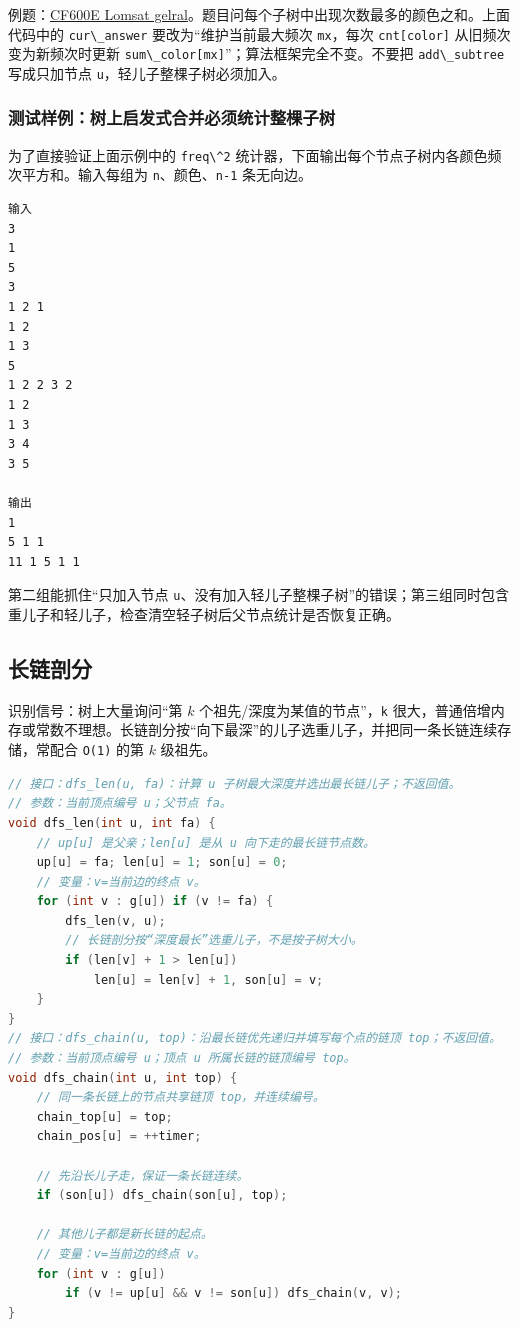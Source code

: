 例题：\href{https://codeforces.com/problemset/problem/600/E}{CF600E Lomsat gelral}。题目问每个子树中出现次数最多的颜色之和。上面代码中的 \passthrough{\lstinline!cur\_answer!} 要改为``维护当前最大频次 \passthrough{\lstinline!mx!}，每次 \passthrough{\lstinline!cnt[color]!} 从旧频次变为新频次时更新 \passthrough{\lstinline!sum\_color[mx]!}''；算法框架完全不变。不要把 \passthrough{\lstinline!add\_subtree!} 写成只加节点 \passthrough{\lstinline!u!}，轻儿子整棵子树必须加入。

\subsubsection{测试样例：树上启发式合并必须统计整棵子树}

为了直接验证上面示例中的 \passthrough{\lstinline!freq\^2!} 统计器，下面输出每个节点子树内各颜色频次平方和。输入每组为 \passthrough{\lstinline!n!}、颜色、\passthrough{\lstinline!n-1!} 条无向边。

\begin{lstlisting}
输入
3
1
5
3
1 2 1
1 2
1 3
5
1 2 2 3 2
1 2
1 3
3 4
3 5

输出
1
5 1 1
11 1 5 1 1
\end{lstlisting}

第二组能抓住``只加入节点 \passthrough{\lstinline!u!}、没有加入轻儿子整棵子树''的错误；第三组同时包含重儿子和轻儿子，检查清空轻子树后父节点统计是否恢复正确。


\subsection{长链剖分}

识别信号：树上大量询问``第 \(k\) 个祖先/深度为某值的节点''，\passthrough{\lstinline!k!} 很大，普通倍增内存或常数不理想。长链剖分按``向下最深''的儿子选重儿子，并把同一条长链连续存储，常配合 \passthrough{\lstinline!O(1)!} 的第 \(k\) 级祖先。

\begin{lstlisting}[language={C++}]
// 接口：dfs_len(u, fa)：计算 u 子树最大深度并选出最长链儿子；不返回值。
// 参数：当前顶点编号 u；父节点 fa。
void dfs_len(int u, int fa) {
    // up[u] 是父亲；len[u] 是从 u 向下走的最长链节点数。
    up[u] = fa; len[u] = 1; son[u] = 0;
    // 变量：v=当前边的终点 v。
    for (int v : g[u]) if (v != fa) {
        dfs_len(v, u);
        // 长链剖分按“深度最长”选重儿子，不是按子树大小。
        if (len[v] + 1 > len[u])
            len[u] = len[v] + 1, son[u] = v;
    }
}
// 接口：dfs_chain(u, top)：沿最长链优先递归并填写每个点的链顶 top；不返回值。
// 参数：当前顶点编号 u；顶点 u 所属长链的链顶编号 top。
void dfs_chain(int u, int top) {
    // 同一条长链上的节点共享链顶 top，并连续编号。
    chain_top[u] = top;
    chain_pos[u] = ++timer;

    // 先沿长儿子走，保证一条长链连续。
    if (son[u]) dfs_chain(son[u], top);

    // 其他儿子都是新长链的起点。
    // 变量：v=当前边的终点 v。
    for (int v : g[u])
        if (v != up[u] && v != son[u]) dfs_chain(v, v);
}
\end{lstlisting}

